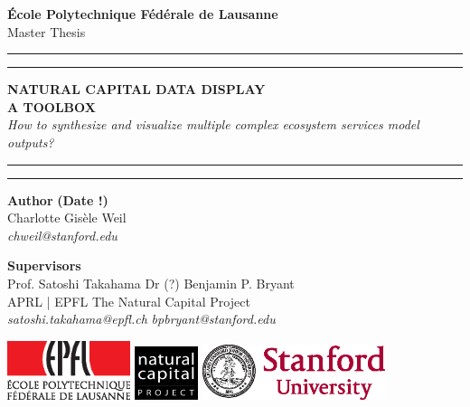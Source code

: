 
\begin{titlingpage}
\begin{center}
\Large
\textbf{École Polytechnique Fédérale de Lausanne} \\
\vspace{1cm}
Master Thesis
\vspace{2cm}
\hrule
\vspace{0.1cm}
\hrule
\vspace{1cm}
\Huge
\textbf{NATURAL CAPITAL DATA DISPLAY} \\
\Huge
\textbf{A TOOLBOX} \\

\Large
\vspace{0.2cm}
\textit{How to synthesize and visualize multiple complex ecosystem services model outputs?} \\

\vspace{1cm}
\hrule
\vspace{0.1cm}
\hrule

\end{center}
\vfill
\noindent \textbf{Author} \hfill \textbf{(Date !)} \\
Charlotte Gisèle Weil \\
\textit{chweil@stanford.edu} \\
\vspace{0.5cm}

\noindent \textbf{Supervisors} \\
Prof. Satoshi Takahama          \hfill    Dr (?) Benjamin P. Bryant \\
APRL | EPFL      \hfill    The Natural Capital Project\\
\textit{satoshi.takahama@epfl.ch} \hfill    \textit{bpbryant@stanford.edu} \\
\vspace{0.8cm}

\noindent

\includegraphics[width=0.27\textwidth]{images/epfl-logo.eps}
\hfill  \hfill \includegraphics[width=0.14\textwidth]{images/natcap-logo.eps} \hfill  \hfill 
\includegraphics[width=0.4\textwidth]{images/stanford-logo.eps}

\end{titlingpage}

